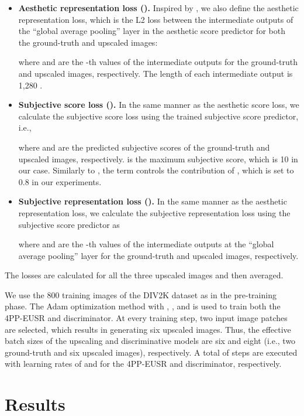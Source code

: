 \documentclass[runningheads]{llncs}
\begin{document}
\begin{itemize}
	\item \textbf{Aesthetic representation loss ().}
	Inspired by \cite{ledig2017photo}, we also define the aesthetic representation loss, which is the L2 loss between the intermediate outputs of the ``global average pooling'' layer in the aesthetic score predictor for both the ground-truth and upscaled images:
	
	where  and  are the -th values of the intermediate outputs for the ground-truth and upscaled images, respectively.
	The length of each intermediate output is 1,280 \cite{sandler2018mobilenetv2}.\\
	
	\item \textbf{Subjective score loss ().}
	In the same manner as the aesthetic score loss, we calculate the subjective score loss using the trained subjective score predictor, i.e.,
	
	where  and  are the predicted subjective scores of the ground-truth and upscaled images, respectively.
	 is the maximum subjective score, which is 10 in our case.
	Similarly to , the term  controls the contribution of , which is set to 0.8 in our experiments.\\
	
	\item \textbf{Subjective representation loss ().}
	In the same manner as the aesthetic representation loss, we calculate the subjective representation loss using the subjective score predictor as
	
	where  and  are the -th values of the intermediate outputs at the ``global average pooling'' layer for the ground-truth and upscaled images, respectively.
	
\end{itemize}
The losses are calculated for all the three upscaled images and then averaged.

We use the 800 training images of the DIV2K dataset as in the pre-training phase.
The Adam optimization method \cite{kingma2014adam} with , , and  is used to train both the 4PP-EUSR and discriminator.
At every training step, two input image patches are selected, which results in generating six upscaled images.
Thus, the effective batch sizes of the upscaling and discriminative models are six and eight (i.e., two ground-truth and six upscaled images), respectively.
A total of  steps are executed with learning rates of  and  for the 4PP-EUSR and discriminator, respectively.



\section{Results}
\label{sec:results}
\end{document}
